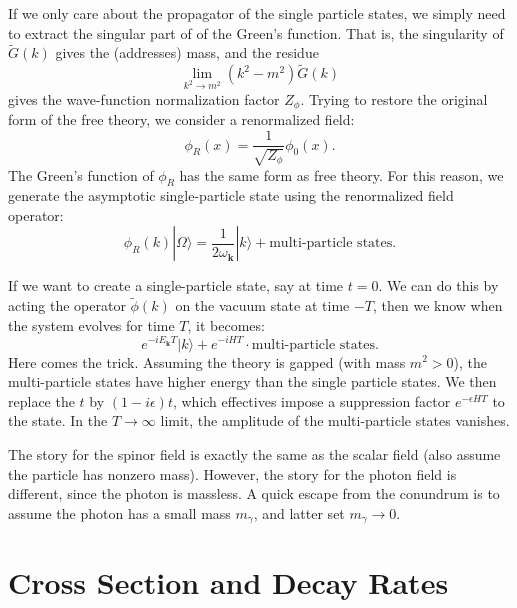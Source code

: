 If we only care about the propagator of the single particle states, we simply need to extract the singular part of of the Green's function.
That is, the singularity of $\tilde{G}(k)$ gives the (addresses) mass, and the residue 
\begin{equation*}
	\lim_{k^2 \rightarrow m^2} (k^2-m^2)\tilde{G}(k)
\end{equation*}
gives the wave-function normalization factor $Z_\phi$.
Trying to restore the original form of the free theory, we consider a renormalized field:
\begin{equation}
	\phi_R(x) = \frac{1}{\sqrt{Z_\phi}}\phi_0(x).
\end{equation}
The Green's function of $\phi_R$ has the same form as free theory.
For this reason, we generate the asymptotic single-particle state using the renormalized field operator:
\begin{equation}\label{eq:scalar-field-generate-particle}
	\phi_R(k)|\Omega\rangle = \frac{1}{2\omega_{\bm k}}|k\rangle + \text{multi-particle states}.
\end{equation}

If we want to create a single-particle state, say at time $t=0$.
We can do this by acting the operator $\tilde{\phi}(k)$ on the vacuum state at time $-T$, then we know when the system evolves for time $T$, it becomes:
\begin{equation}
	e^{-i E_{\bm k} T}|k\rangle + e^{-iHT} \cdot \text{multi-particle states}.
\end{equation}
Here comes the trick.
Assuming the theory is gapped (with mass $m^2>0$), the multi-particle states have higher energy than the single particle states.
We then replace the $t$ by $(1-i\epsilon)t$, which effectives impose a suppression factor $e^{-\epsilon H T}$ to the state.
In the $T\rightarrow \infty$ limit, the amplitude of the multi-particle states vanishes.

The story for the spinor field is exactly the same as the scalar field (also assume the particle has nonzero mass).
However, the story for the photon field is different, since the photon is massless.
A quick escape from the conundrum is to assume the photon has a small mass $m_\gamma$, and latter set $m_\gamma \rightarrow 0$.



\section{Cross Section and Decay Rates}

